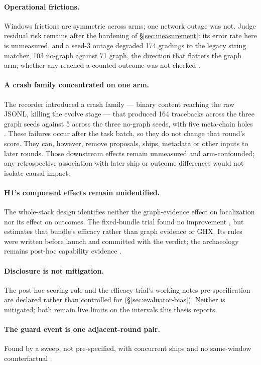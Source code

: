 \paragraph{Operational frictions.} Windows frictions are symmetric across
arms; one network outage was not. Judge residual risk remains after the
hardening of \S\ref{sec:measurement}: its error rate here is unmeasured,
and a seed-3 outage degraded 174 gradings to the legacy string matcher,
103 no-graph against 71 graph, the direction that flatters the graph arm;
whether any reached a counted outcome was not checked .

\paragraph{A crash family concentrated on one arm.} The recorder introduced a
crash family --- binary content reaching the raw JSONL, killing the evolve
stage --- that produced 164 tracebacks across the three graph seeds against
5 across the three no-graph seeds, with five meta-chain holes . These
failures occur after the task batch, so they do not change that round's
score. They can, however, remove proposals, ships, metadata or other inputs
to later rounds. Those downstream effects remain unmeasured and
arm-confounded; any retrospective association with later ship or outcome
differences would not isolate causal impact.

\paragraph{H1's component effects remain unidentified.} The whole-stack
design identifies neither the graph-evidence effect on localization
 nor its effect on outcomes. The fixed-bundle trial found no
improvement , but estimates that bundle's efficacy rather than
graph evidence or GHX. Its rules were written before launch and committed
with the verdict; the archaeology remains post-hoc capability evidence
.

\paragraph{Disclosure is not mitigation.} The post-hoc scoring rule and
the efficacy trial's working-notes pre-specification are declared rather
than controlled for (\S\ref{sec:evaluator-bias}). Neither is mitigated;
both remain live limits on the intervals this thesis reports.

\paragraph{The guard event is one adjacent-round pair.} Found by a sweep,
not pre-specified, with concurrent ships and no same-window counterfactual
.

